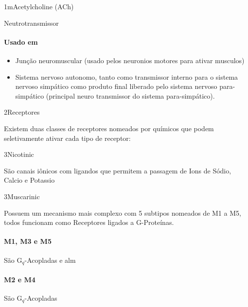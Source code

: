 \documentclass[\mainfilename]{subfiles}
\begin{document}
\begin{sectionBox}1m{Acetylcholine (ACh)} %
    
    Neutrotransmissor

    \paragraph*{Usado em}
    \begin{itemize}
        \item Junção neuromuscular (usado pelos neuronios motores para ativar musculos)
        \item Sistema nervoso autonomo, tanto como transmissor interno para o sistema nervoso simpático como produto final liberado pelo sistema nervoso para-simpático (principal neuro transmissor do sistema para-simpático).
    \end{itemize}

    \begin{sectionBox}2{Receptores} %
        
        Existem duas classes de receptores nomeados por químicos que podem seletivamente ativar cada tipo de receptor:

        \begin{sectionBox}3{Nicotinic} %
            
            São canais iônicos com ligandos que permitem a passagem de Ions de Sódio, Calcio e Potassio
            
        \end{sectionBox}
    
        \begin{sectionBox}3{Muscarinic} %
            
            Possuem um mecanismo mais complexo com 5 subtipos nomeados de M1 a M5, todos funcionam como Receptores ligados a G-Proteínas.\\
    
            \paragraph*{M1, M3 e M5} 
            São G\(_q\)-Acopladas e alm
            \paragraph*{M2 e M4} São G\(_q\)-Acopladas
            
        \end{sectionBox}

    \end{sectionBox}

    
\end{sectionBox}
\end{document}
